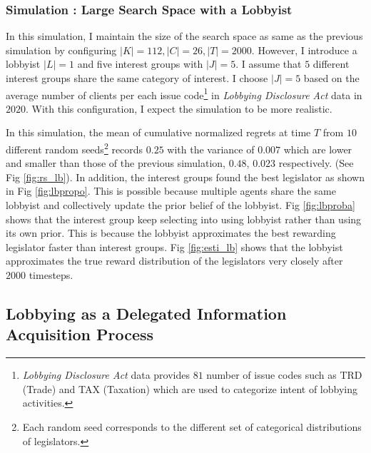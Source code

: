 \documentclass{article}
\begin{document}
\subsubsection{Simulation : Large Search Space with a Lobbyist}

In this simulation, I maintain the size of the search space as same as the previous simulation 
by configuring $|K|=112, |C|=26, |T|=2000$.
However, I introduce a lobbyist $|L|=1$ and five interest groups with $|J|=5$. 
I assume that $5$ different interest groups
share the same category of interest. I choose $|J|=5$ based on the 
average number of clients per each issue code\footnote{
    \textit{Lobbying Disclosure Act} data provides $81$ number of issue codes such as 
    TRD (Trade) and TAX (Taxation) which are used to categorize intent of lobbying activities.
    } in \textit{Lobbying Disclosure Act} data in $2020$.
With this configuration, I expect 
the simulation to be more realistic.

In this simulation, the mean of cumulative normalized regrets at time $T$ from 
$10$ different random seeds\footnote{Each random seed  
corresponds to the different set of categorical distributions of legislators. 
} records $0.25$ with the variance of $0.007$ which are lower and smaller than those of the previous simulation, $0.48$, $0.023$ respectively. 
(See Fig \ref{fig:rs_lb}).
In addition, 
the interest groups found the best legislator as shown in Fig \ref{fig:lbpropo}.  
This is possible because multiple agents 
share the same lobbyist and collectively update 
the prior belief of the lobbyist. 
Fig \ref{fig:lbproba} 
shows that the interest group keep selecting into using 
lobbyist rather than using its own prior. 
This is because 
the lobbyist approximates the best rewarding legislator faster than interest groups.
Fig \ref{fig:esti_lb} shows that the lobbyist approximates 
the true reward distribution of the legislators very closely after $2000$ timesteps. 
 
\subsection{\large{Lobbying as a Delegated Information Acquisition Process}}
\end{document}
